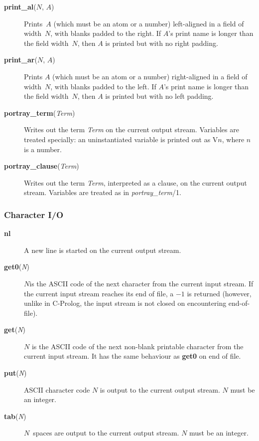 \begin{description}
\item[{\bf print\_al}($N$, $A$)]
    Prints~$A$ (which must be an atom or a number) left-aligned in a field
    of width~$N$, with blanks padded to the right.
    If $A$'s print name is longer than the field width~$N$,
    then $A$ is printed but with no right padding.

\item[{\bf print\_ar}($N$, $A$)]
    Prints $A$ (which must be an atom or a number) right-aligned in a field
    of width~$N$, with blanks padded to the left.
    If $A$'s print name is longer than the field width~$N$,
    then $A$ is printed but with no left padding.

\item[{\bf portray\_term}({\em Term})]
    Writes out the term {\em Term} on the current output stream.
    Variables are treated specially:
    an uninstantiated variable is printed out as V\/$n$, where $n$ is a number.

\item[{\bf portray\_clause}({\em Term})]
    Writes out the term {\em Term}, interpreted as a clause, on the current
    output stream.
    Variables are treated as in {\em portray\_term}/1.
\end{description}

\subsubsection{Character I/O}

\begin{description}
\item[{\bf nl}] 
    A new line is started on the current output stream.

\item[{\bf get0}({\em N})] 
    $N$is the ASCII code of the next character from the current input stream.
    If the current input stream reaches its end of file,
    a $-1$ is returned (however, unlike in C-Prolog,
    the input stream is not closed on encountering end-of-file).

\item[{\bf get}({\em N})] 
    $N$ is the ASCII code of the next non-blank printable character
    from the current input stream. It has the same behaviour as {\bf get0}
    on end of file.

\item[{\bf put}({\em N})] 
    ASCII character code $N$ is output to the current output stream.
    $N$ must be an integer.

\item[{\bf tab}({\em N})] 
    $N$~spaces are output to the current output stream.
    $N$ must be an integer.
\end{description}

